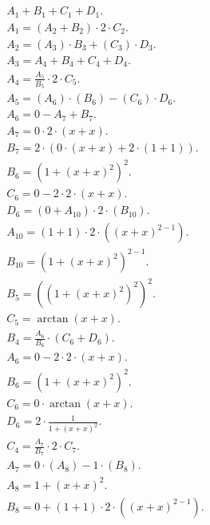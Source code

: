 \documentclass[12pt,a4paper]{extreport}
\begin{document}
\begin{multline}
\\
A_{1} + B_{1} + C_{1} + D_{1}.\\
A_{1} = (A_{2} + B_{2}) \cdot 2 \cdot C_{2}.\\
A_{2} = (A_{3}) \cdot B_{3} + (C_{3}) \cdot D_{3}.\\
A_{3} = A_{4} + B_{4} + C_{4} + D_{4}.\\
A_{4} = \frac{A_{5}}{B_{5}} \cdot 2 \cdot C_{5}.\\
A_{5} = (A_{6}) \cdot (B_{6}) - (C_{6}) \cdot D_{6}.\\
A_{6} = 0 - A_{7} + B_{7}.\\
A_{7} = 0 \cdot 2 \cdot (x + x).\\
B_{7} = 2 \cdot (0 \cdot (x + x) + 2 \cdot (1 + 1)).\\
B_{6} = (1 + (x + x) ^ {2}) ^ {2}.\\
C_{6} = 0 - 2 \cdot 2 \cdot (x + x).\\
D_{6} = (0 + A_{10}) \cdot 2 \cdot (B_{10}).\\
A_{10} = (1 + 1) \cdot 2 \cdot ((x + x) ^ {2 - 1}).\\
B_{10} = (1 + (x + x) ^ {2}) ^ {2 - 1}.\\
B_{5} = ((1 + (x + x) ^ {2}) ^ {2}) ^ {2}.\\
C_{5} = \arctan(x + x).\\
B_{4} = \frac{A_{6}}{B_{6}} \cdot (C_{6} + D_{6}).\\
A_{6} = 0 - 2 \cdot 2 \cdot (x + x).\\
B_{6} = (1 + (x + x) ^ {2}) ^ {2}.\\
C_{6} = 0 \cdot \arctan(x + x).\\
D_{6} = 2 \cdot \frac{1}{1 + (x + x) ^ {2}}.\\
C_{4} = \frac{A_{7}}{B_{7}} \cdot 2 \cdot C_{7}.\\
A_{7} = 0 \cdot (A_{8}) - 1 \cdot (B_{8}).\\
A_{8} = 1 + (x + x) ^ {2}.\\
B_{8} = 0 + (1 + 1) \cdot 2 \cdot ((x + x) ^ {2 - 1}).\\
\end{multline}
\end{document}
